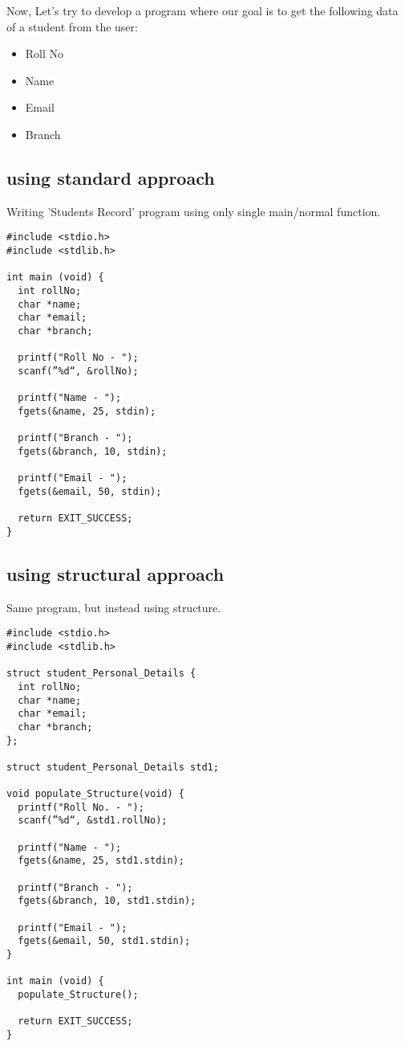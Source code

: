 \documentclass[11pt]{article}
\begin{document}
Now, Let’s try to develop a program where our goal is to get the following data
of a student from the user:

\begin{itemize}
\item Roll No
\item Name
\item Email
\item Branch
\end{itemize}

\subsection{using standard approach}
\label{sec:org7319734}

Writing ’Students Record’ program using only single main/normal function.

\begin{verbatim}
#include <stdio.h>
#include <stdlib.h>

int main (void) {
  int rollNo;
  char *name;
  char *email;
  char *branch;

  printf("Roll No - ");
  scanf(”%d“, &rollNo);

  printf("Name - ");
  fgets(&name, 25, stdin);

  printf("Branch - ");
  fgets(&branch, 10, stdin);

  printf("Email - ");
  fgets(&email, 50, stdin);

  return EXIT_SUCCESS;
}
\end{verbatim}

\subsection{using structural approach}
\label{sec:orge4130e9}

Same program, but instead using structure.

\begin{verbatim}
#include <stdio.h>
#include <stdlib.h>

struct student_Personal_Details {
  int rollNo;
  char *name;
  char *email;
  char *branch;
};

struct student_Personal_Details std1;

void populate_Structure(void) {
  printf("Roll No. - ");
  scanf(”%d“, &std1.rollNo);

  printf("Name - ");
  fgets(&name, 25, std1.stdin);

  printf("Branch - ");
  fgets(&branch, 10, std1.stdin);

  printf("Email - ");
  fgets(&email, 50, std1.stdin);
}

int main (void) {
  populate_Structure();

  return EXIT_SUCCESS;
}
\end{verbatim}
\end{document}
